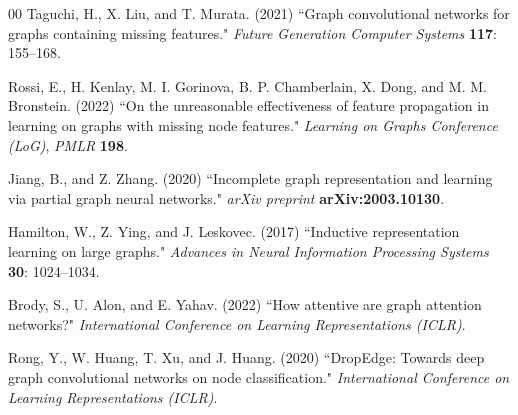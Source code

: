 \documentclass[3p,times,procedia]{elsarticle}
\begin{document}
\begin{thebibliography}{00}
Taguchi, H., X. Liu, and T. Murata. (2021) ``Graph convolutional
networks for graphs containing missing features." {\it Future Generation
Computer Systems} {\bf 117}: 155--168.

Rossi, E., H. Kenlay, M. I. Gorinova, B. P. Chamberlain, X. Dong, and
M. M. Bronstein. (2022) ``On the unreasonable effectiveness of feature
propagation in learning on graphs with missing node features."
{\it Learning on Graphs Conference (LoG)}, {\it PMLR} {\bf 198}.

Jiang, B., and Z. Zhang. (2020) ``Incomplete graph representation and
learning via partial graph neural networks." {\it arXiv preprint}
{\bf arXiv:2003.10130}.

Hamilton, W., Z. Ying, and J. Leskovec. (2017) ``Inductive
representation learning on large graphs." {\it Advances in Neural
Information Processing Systems} {\bf 30}: 1024--1034.

Brody, S., U. Alon, and E. Yahav. (2022) ``How attentive are
graph attention networks?" {\it International Conference on Learning
Representations (ICLR)}.

Rong, Y., W. Huang, T. Xu, and J. Huang. (2020)
``DropEdge: Towards deep graph convolutional networks on node
classification." {\it International Conference on Learning
Representations (ICLR)}.

\end{thebibliography}
\end{document}
